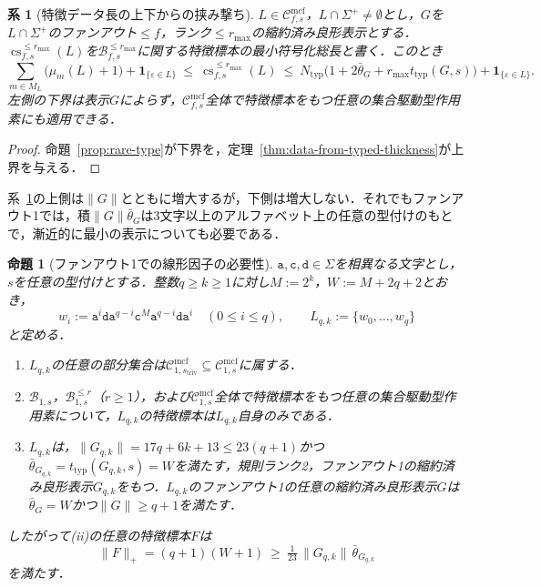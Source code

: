 \documentclass[11pt,a4paper]{ltjsarticle}
\numberwithin{equation}{section}
\theoremstyle{plain}
\newtheorem{proposition}[theorem]{命題}
\newtheorem{corollary}[theorem]{系}
\theoremstyle{definition}
\theoremstyle{remark}
\newcommand{\Cmcf}[2]{\mathcal{C}^{\mathrm{mcf}}_{#1,#2}}
\newcommand{\eps}{\varepsilon}
\begin{document}
\begin{corollary}[特徴データ長の上下からの挟み撃ち]
\label{cor:typed-sandwich}
$L\in\Cmcf{f}{s}$，$L\cap\Sigma^+\ne\emptyset$とし，$G$を$L\cap\Sigma^+$のファンアウト$\le f$，ランク$\le r_{\max}$の縮約済み良形表示とする．
$\operatorname{cs}^{\le r_{\max}}_{f,s}(L)$を$\mathcal B^{\le r_{\max}}_{f,s}$に関する特徴標本の最小符号化総長と書く．このとき
\[
 \sum_{m\in M_L}\bigl(\mu_m(L)+1\bigr)+\mathbf 1_{\{\eps\in L\}}
 \ \le\ \operatorname{cs}^{\le r_{\max}}_{f,s}(L)
 \ \le\ N_{\mathrm{typ}}
   \bigl(1+2\bar\theta_G+r_{\max}t_{\mathrm{typ}}(G,s)\bigr)
 +\mathbf 1_{\{\eps\in L\}}.
\]
左側の下界は表示$G$によらず，$\Cmcf{f}{s}$全体で特徴標本をもつ任意の集合駆動型作用素にも適用できる．
\end{corollary}
\begin{proof}
命題~\ref{prop:rare-type}が下界を，定理~\ref{thm:data-from-typed-thickness}が上界を与える．
\end{proof}

系~\ref{cor:typed-sandwich}の上側は$\|G\|$とともに増大するが，下側は増大しない．それでもファンアウト1では，積$\|G\|\bar\theta_G$は3文字以上のアルファベット上の任意の型付けのもとで，漸近的に最小の表示についても必要である．

\begin{proposition}[ファンアウト1での線形因子の必要性]
\label{prop:linear-factor-sharp}
$\mathtt a,\mathtt c,\mathtt d\in\Sigma$を相異なる文字とし，$s$を任意の型付けとする．整数$q\ge k\ge1$に対し$M:=2^k$，$W:=M+2q+2$とおき，
\[
 w_i:=\mathtt a^i\mathtt d\mathtt a^{q-i}\mathtt c^M\mathtt a^{q-i}\mathtt d
 \mathtt a^i\quad(0\le i\le q),\qquad L_{q,k}:=\{w_0,\ldots,w_q\}
\]
と定める．
\begin{enumerate}[label=\textup{(\roman*)},leftmargin=*]
\item $L_{q,k}$の任意の部分集合は$\Cmcf{1}{s_{\mathrm{triv}}}\subseteq\Cmcf{1}{s}$に属する．
\item $\mathcal B_{1,s}$，$\mathcal B^{\le r}_{1,s}$（$r\ge1$），および$\Cmcf{1}{s}$全体で特徴標本をもつ任意の集合駆動型作用素について，$L_{q,k}$の特徴標本は$L_{q,k}$自身のみである．
\item $L_{q,k}$は，$\|G_{q,k}\|=17q+6k+13\le23(q+1)$かつ$\bar\theta_{G_{q,k}}=t_{\mathrm{typ}}(G_{q,k},s)=W$を満たす，規則ランク2，ファンアウト1の縮約済み良形表示$G_{q,k}$をもつ．$L_{q,k}$のファンアウト1の任意の縮約済み良形表示$G$は$\bar\theta_G=W$かつ$\|G\|\ge q+1$を満たす．
\end{enumerate}
したがって(ii)の任意の特徴標本$F$は
\[
 \|F\|_+=(q+1)(W+1)\ \ge\ \tfrac1{23}\,\|G_{q,k}\|\,\bar\theta_{G_{q,k}}
\]
を満たす．
\end{proposition}
\end{document}
